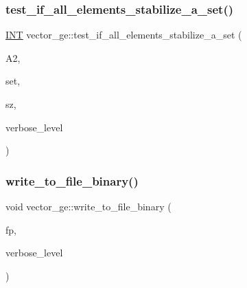 \subsubsection{\texorpdfstring{test\+\_\+if\+\_\+all\+\_\+elements\+\_\+stabilize\+\_\+a\+\_\+set()}{test\_if\_all\_elements\_stabilize\_a\_set()}}
{\footnotesize\ttfamily \mbox{\hyperlink{galois_8h_a09fddde158a3a20bd2dcadb609de11dc}{I\+NT}} vector\+\_\+ge\+::test\+\_\+if\+\_\+all\+\_\+elements\+\_\+stabilize\+\_\+a\+\_\+set (\begin{DoxyParamCaption}\item[{\mbox{\hyperlink{classaction}{action}} $\ast$}]{A2,  }\item[{\mbox{\hyperlink{galois_8h_a09fddde158a3a20bd2dcadb609de11dc}{I\+NT}} $\ast$}]{set,  }\item[{\mbox{\hyperlink{galois_8h_a09fddde158a3a20bd2dcadb609de11dc}{I\+NT}}}]{sz,  }\item[{\mbox{\hyperlink{galois_8h_a09fddde158a3a20bd2dcadb609de11dc}{I\+NT}}}]{verbose\+\_\+level }\end{DoxyParamCaption})}

\mbox{\label{classvector__ge_a59e1a59dace86ad6433f5fda72a66597}} 
\subsubsection{\texorpdfstring{write\+\_\+to\+\_\+file\+\_\+binary()}{write\_to\_file\_binary()}}
{\footnotesize\ttfamily void vector\+\_\+ge\+::write\+\_\+to\+\_\+file\+\_\+binary (\begin{DoxyParamCaption}\item[{ofstream \&}]{fp,  }\item[{\mbox{\hyperlink{galois_8h_a09fddde158a3a20bd2dcadb609de11dc}{I\+NT}}}]{verbose\+\_\+level }\end{DoxyParamCaption})}

\mbox{\label{classvector__ge_a1cffa952edafd4ae7c350437a9d68106}} 
